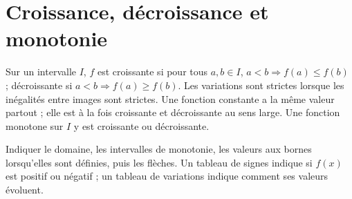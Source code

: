 \section{Croissance, décroissance et monotonie}
\begin{cours}[Définitions]
Sur un intervalle $I$, $f$ est croissante si pour tous $a,b\in I$, $a<b\Rightarrow f(a)\leq f(b)$ ; décroissante si $a<b\Rightarrow f(a)\geq f(b)$. Les variations sont strictes lorsque les inégalités entre images sont strictes. Une fonction constante a la même valeur partout ; elle est à la fois croissante et décroissante au sens large.
Une fonction monotone sur $I$ y est croissante ou décroissante.
\end{cours}
\begin{methode}
Indiquer le domaine, les intervalles de monotonie, les valeurs aux bornes lorsqu'elles sont définies, puis les flèches. Un tableau de signes indique si $f(x)$ est positif ou négatif ; un tableau de variations indique comment ses valeurs évoluent.
\end{methode}

